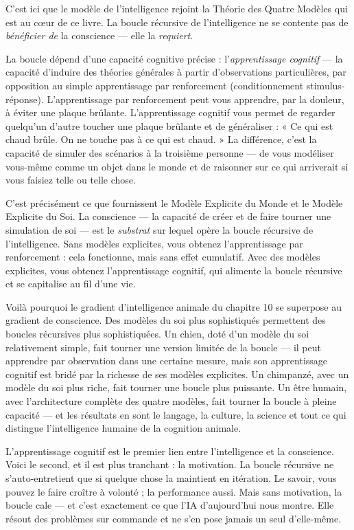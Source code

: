 \documentclass[11pt, twoside, openright]{book}
\begin{document}
C'est ici que le modèle de l'intelligence rejoint la Théorie des Quatre Modèles qui est au cœur de ce livre. La boucle récursive de l'intelligence ne se contente pas de \textit{bénéficier de} la conscience --- elle la \textit{requiert}.

La boucle dépend d'une capacité cognitive précise : l'\textit{apprentissage cognitif} --- la capacité d'induire des théories générales à partir d'observations particulières, par opposition au simple apprentissage par renforcement (conditionnement stimulus-réponse). L'apprentissage par renforcement peut vous apprendre, par la douleur, à éviter une plaque brûlante. L'apprentissage cognitif vous permet de regarder quelqu'un d'autre toucher une plaque brûlante et de généraliser : « Ce qui est chaud brûle. On ne touche pas à ce qui est chaud. » La différence, c'est la capacité de simuler des scénarios à la troisième personne --- de vous modéliser vous-même comme un objet dans le monde et de raisonner sur ce qui arriverait si vous faisiez telle ou telle chose.

C'est précisément ce que fournissent le Modèle Explicite du Monde et le Modèle Explicite du Soi. La conscience --- la capacité de créer et de faire tourner une simulation de soi --- est le \textit{substrat} sur lequel opère la boucle récursive de l'intelligence. Sans modèles explicites, vous obtenez l'apprentissage par renforcement : cela fonctionne, mais sans effet cumulatif. Avec des modèles explicites, vous obtenez l'apprentissage cognitif, qui alimente la boucle récursive et se capitalise au fil d'une vie.

Voilà pourquoi le gradient d'intelligence animale du chapitre 10 se superpose au gradient de conscience. Des modèles du soi plus sophistiqués permettent des boucles récursives plus sophistiquées. Un chien, doté d'un modèle du soi relativement simple, fait tourner une version limitée de la boucle --- il peut apprendre par observation dans une certaine mesure, mais son apprentissage cognitif est bridé par la richesse de ses modèles explicites. Un chimpanzé, avec un modèle du soi plus riche, fait tourner une boucle plus puissante. Un être humain, avec l'architecture complète des quatre modèles, fait tourner la boucle à pleine capacité --- et les résultats en sont le langage, la culture, la science et tout ce qui distingue l'intelligence humaine de la cognition animale.

L'apprentissage cognitif est le premier lien entre l'intelligence et la conscience. Voici le second, et il est plus tranchant : la motivation. La boucle récursive ne s'auto-entretient que si quelque chose la maintient en itération. Le savoir, vous pouvez le faire croître à volonté ; la performance aussi. Mais sans motivation, la boucle cale --- et c'est exactement ce que l'IA d'aujourd'hui nous montre. Elle résout des problèmes sur commande et ne s'en pose jamais un seul d'elle-même.
\end{document}
